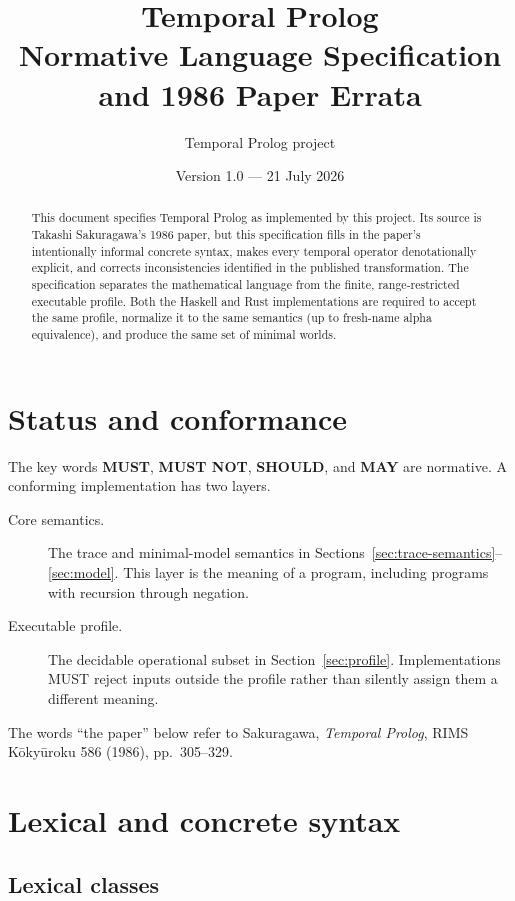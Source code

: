 \documentclass[11pt]{article}
\title{Temporal Prolog\\\large Normative Language Specification and 1986 Paper Errata}
\author{Temporal Prolog project}
\date{Version 1.0 --- 21 July 2026}
\begin{document}
\maketitle

\begin{abstract}
This document specifies Temporal Prolog as implemented by this project.  Its
source is Takashi Sakuragawa's 1986 paper, but this specification fills in the
paper's intentionally informal concrete syntax, makes every temporal operator
denotationally explicit, and corrects inconsistencies identified in the
published transformation.  The specification separates the mathematical
language from the finite, range-restricted executable profile.  Both the
Haskell and Rust implementations are required to accept the same profile,
normalize it to the same semantics (up to fresh-name alpha equivalence), and
produce the same set of minimal worlds.
\end{abstract}

\tableofcontents

\section{Status and conformance}

The key words \textbf{MUST}, \textbf{MUST NOT}, \textbf{SHOULD}, and
\textbf{MAY} are normative.  A conforming implementation has two layers.

\begin{description}
  \item[Core semantics.] The trace and minimal-model semantics in
  Sections~\ref{sec:trace-semantics}--\ref{sec:model}.  This layer is the
  meaning of a program, including programs with recursion through negation.
  \item[Executable profile.] The decidable operational subset in
  Section~\ref{sec:profile}.  Implementations MUST reject inputs outside the
  profile rather than silently assign them a different meaning.
\end{description}

The words ``the paper'' below refer to Sakuragawa, \emph{Temporal Prolog},
RIMS K\={o}ky\={u}roku 586 (1986), pp.~305--329.

\section{Lexical and concrete syntax}

\subsection{Lexical classes}
\end{document}
